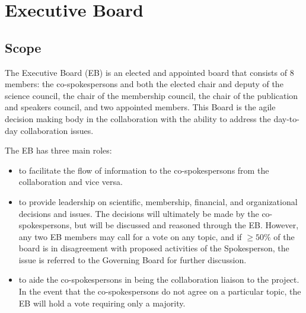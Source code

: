 \documentclass[12pt]{article}
\newcommand{\Comment}[1]{\textcolor{Blue}{(Comment: #1)}}
\begin{document}



\newpage

\section{Executive Board}
\label{sec:exec}

\subsection{Scope}

The Executive Board (EB) is an elected and appointed board that consists of 8 members: the co-spokespersons and both the elected chair and deputy of the science council, the chair of the membership council, the chair of the publication and speakers council, and two appointed members. This Board is the agile decision making body in the collaboration with the ability to address the day-to-day collaboration issues. 

The EB has three main roles:
\begin{itemize}
\item to facilitate the flow of information to the co-spokespersons from the collaboration and vice versa.
\item to provide leadership on scientific, membership, financial, and organizational decisions and issues. The decisions will ultimately be made by the co-spokespersons, but will be discussed and reasoned through the EB.  However, any two EB members may call for a vote on any topic, and if $\geq 50\%$ of the board is in disagreement with proposed activities of the Spokesperson, the issue is referred to the Governing Board for further discussion. %
\item to aide the co-spokespersons in being the collaboration liaison to the project. In the event that the co-spokespersons do not agree on a particular topic, the EB will hold a vote requiring only a majority.

\end{itemize}
\end{document}
